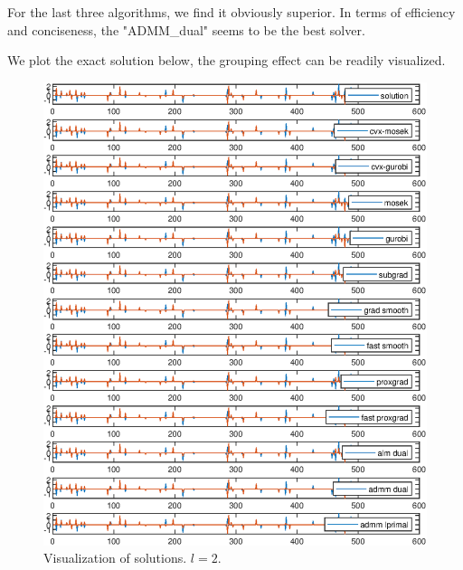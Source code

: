 \documentclass{article}
\numberwithin{equation}{section}
\numberwithin{figure}{section}
\begin{document}
For the last three algorithms, we find it obviously superior. In terms of efficiency and conciseness, the "ADMM\_dual" seems to be the best solver. 

We plot the exact solution
below, the grouping effect can be readily visualized.
\clearpage
\begin{figure}[htbp]
    \centering
    \includegraphics[width=\textwidth]{hw.eps}
    \caption{Visualization of solutions. $l=2$.}
    \label{fig:my_label}
\end{figure}



% 
% 
\end{document}
